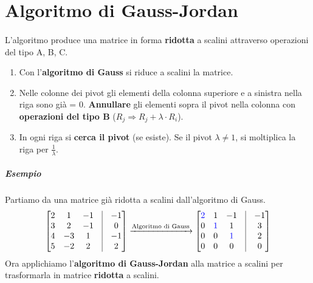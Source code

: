 \documentclass[a4paper, 12pt]{report}
\begin{document}
        \section{Algoritmo di Gauss-Jordan}
            \paragraph{}L'algoritmo produce una matrice in forma \textbf{ridotta} a scalini attraverso operazioni
            del tipo A, B, C.
                \begin{enumerate}
                    \item Con l'\textbf{algoritmo di Gauss} si riduce a scalini la matrice.
                    \item Nelle colonne dei pivot gli elementi della colonna superiore e a sinistra nella riga sono già = 0.
                    \textbf{Annullare} gli elementi sopra il pivot nella colonna con \textbf{operazioni del tipo B} ($R_j \Rightarrow R_j + \lambda \cdot R_i$).
                    \item In ogni riga si \textbf{cerca il pivot} (se esiste). Se il pivot $\lambda \neq 1$, si moltiplica la riga per $\frac{1}{\lambda}$.
                \end{enumerate}
                \subparagraph{Esempio}Partiamo da una matrice già ridotta a scalini dall'algoritmo di Gauss.
                    $$
                    \begin{bmatrix}
                        2 & 1 & -1 & \vline & -1\\
                        3 & 2 & -1 & \vline & 0\\
                        4 & -3 & 1 & \vline & -1\\
                        5 & -2 & 2 & \vline & 2
                    \end{bmatrix}
                    \xrightarrow[]{\text{Algoritmo di Gauss}}
                    \begin{bmatrix}
                        \textcolor{blue}{2} & 1 & -1 & \vline & -1\\
                        0 & \textcolor{blue}{1} & 1 & \vline & 3\\
                        0 & 0 & \textcolor{blue}{1} & \vline & 2\\
                        0 & 0 & 0 & \vline & 0
                    \end{bmatrix}
                    $$ 
                    Ora applichiamo l'\textbf{algoritmo di Gauss-Jordan} alla matrice a scalini per trasformarla in matrice \textbf{ridotta} a scalini.
\end{document}
